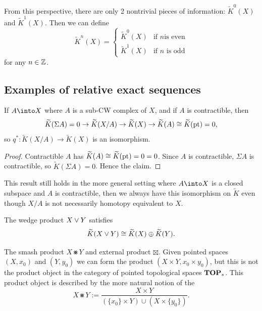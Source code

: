 \begin{node}
From this perspective, there are only 2 nontrivial pieces of
information: $\widetilde{K}^{0}(X)$ and $\widetilde{K}^{1}(X)$. Then
we can define
\begin{equation}
\widetilde{K}^{n}(X)=\begin{cases}\widetilde{K}^{0}(X) & \mbox{if $n$
  is even}\\
\widetilde{K}^{1}(X) & \mbox{if $n$ is odd}
\end{cases}
\end{equation}
for any $n\in\ZZ$.
\end{node}

\subsection{Examples of relative exact sequences}

\begin{node}
If $A\into X$ where $A$ is a sub-CW complex of $X$, and if $A$ is
contractible, then
\begin{equation}
\widetilde{K}(\Sigma A)=0\to\widetilde{K}(X/A)\to\widetilde{K}(X)\to\widetilde{K}(A)\iso\widetilde{K}(\point{*})=0,
\end{equation}
so $q^{*}\colon\widetilde{K}(X/A)\to\widetilde{K}(X)$ is an isomorphism.
\end{node}

\begin{proof}
Contractible $A$ has $\widetilde{K}(A)\iso\widetilde{K}(\point{*})=0=0$.
Since $A$ is contractible, $\Sigma A$ is contractible, so $\widetilde{K}(\Sigma A)=0$.
Hence the claim.
\end{proof}

\begin{remark}
This result still holds in the more general setting where $A\into X$
is a closed subspace and $A$ is contractible, then we always have this
isomorphism on $\widetilde{K}$ even though $X/A$ is not necessarily
homotopy equivalent to $X$.
\end{remark}

\begin{example}
The wedge product $X\wedgetimes Y$ satisfies
\begin{equation}
\widetilde{K}(X\wedgetimes Y)\iso\widetilde{K}(X)\oplus\widetilde{K}(Y).
\end{equation}
\end{example}

\begin{definition}
The smash product $X\smashtimes Y$ and external product
$\boxtimes$. Given pointed spaces $(X,x_{0})$ and $(Y,y_{0})$ we can
form the product $(X\times Y,x_{0}\times y_{0})$, but this is not the
product object in the category of pointed topological spaces $\TOP_{*}$.
This product object is described by the more natural notion of the
\begin{equation}
X\smashtimes Y:=\frac{X\times Y}{(\{x_{0}\}\times Y)\cup(X\times\{y_{0}\})}.
\end{equation}
\end{definition}

